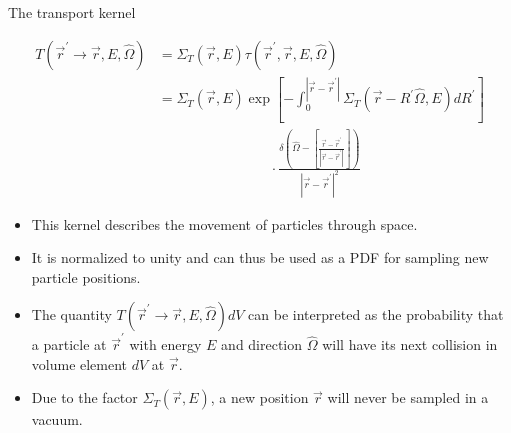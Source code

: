 \documentclass{beamer}
\begin{document}
\begin{frame}{The transport kernel}

  \begin{align}
    T(\vec{r}^{'} \to \vec{r},E,\hat{\Omega}) & = \Sigma_T(\vec{r},E)
    \tau(\vec{r}^{'},\vec{r},E,\hat{\Omega}) \nonumber \\
    & = \Sigma_T(\vec{r},E)
    \exp{\left[-\int_0^{|\vec{r} - \vec{r}^{'}|} 
        \Sigma_T(\vec{r}-R^{'}\hat{\Omega},E)dR^{'} \right]} \nonumber \\
    & \qquad \qquad \qquad \qquad \cdot
    \frac{\delta \left(\hat{\Omega} - \left[\frac{\vec{r} - \vec{r}^{'}}
        {|\vec{r} - \vec{r}^{'}|}\right]\right)}
         {|\vec{r} - \vec{r}^{'}|^2} \nonumber
  \end{align}

  \begin{itemize}
    \item This kernel describes the movement of particles through space.
    \item It is normalized to unity and can thus be used as a PDF for sampling
      new particle positions.
    \item The quantity $T(\vec{r}^{'} \to \vec{r},E,\hat{\Omega})dV$ can be 
      interpreted as the probability that a particle at $\vec{r}^{'}$ with 
      energy $E$ and direction $\hat{\Omega}$ will have its next collision in 
      volume element $dV$ at $\vec{r}$.
    \item Due to the factor $\Sigma_T(\vec{r},E)$, a new position $\vec{r}$ will
      never be sampled in a vacuum.
  \end{itemize}

\end{frame}
\end{document}
